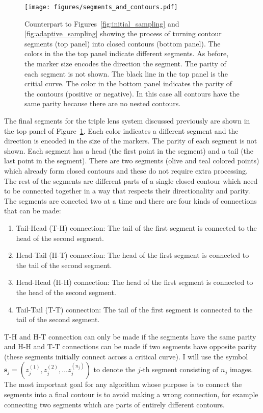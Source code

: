 \documentclass[12pt,dvipsnames]{report}
\begin{document}
\begin{figure}[t]
    \begin{centering}
        \texttt{[image: figures/segments\_and\_contours.pdf]}
        \caption{Counterpart to Figures~\ref{fig:initial_sampling} and \ref{fig:adaptive_sampling} 
        showing the process of turning contour segments (top panel) into closed contours (bottom
        panel). The colors in the the top panel indicate different segments. As before, the marker 
        size encodes the direction the segment. The parity of each segment is not shown.
        The black line in the top panel is the critial curve. The color in the bottom 
        panel indicates the parity of the contours (positive or negative). In this case all 
        contours have the  same parity because there are no nested contours.}
        \label{fig:segments_and_contours}
    \end{centering}
\end{figure}

The final segments for the triple lens system discussed previously are shown in the top panel 
of Figure~\ref{fig:segments_and_contours}. Each color indicates a different segment and the 
direction is encoded in the size of the markers. The parity of each segment is not shown.
Each segment has a head  (the first point in the segment) and a tail (the last point in the segment).
There are two segments (olive and teal colored points) which already form closed contours and these
do not require extra processing. The rest of the segments are different parts of a single
closed contour which need to be connected together in a way that respects their directionality 
and parity. The segments are conected two at a time and there are four kinds of connections 
that can be made:
\begin{enumerate}
    \item Tail-Head (T-H) connection: The tail of the first segment is connected to the head of the 
    second segment.
    \item Head-Tail (H-T) connection: The head of the first segment is connected to the tail of the
    second segment.
    \item Head-Head (H-H) connection: The head of the first segment is connected to the head of the
    second segment.
    \item Tail-Tail (T-T) connection: The tail of the first segment is connected to the tail of the
    second segment.
\end{enumerate}
T-H and H-T connection can only be made if the segments have the same parity and H-H and T-T
connections can be made if two segments have opposite parity (these segments initially 
connect across a critical curve). I will use the symbol 
$\mathbf{s}_j=(z^{(1)}_j, z^{(2)}_j,\ldots z^{(n_j)}_j)$ to denote the $j$-th segment consisting
of $n_j$ images. The most important goal for any algorithm whose purpose is to connect the 
segments into a final contour is to avoid making a wrong connection, for example connecting
two segments which are parts of entirely different contours. 
\end{document}
